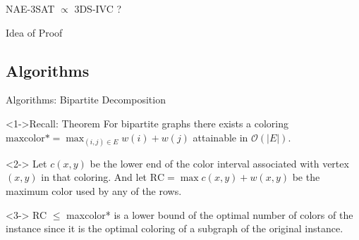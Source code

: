 \begin{frame}{NAE-3SAT $\propto$ 3DS-IVC ?}
  \begin{block}{Idea of Proof}
    \begin{itemize}
    \end{itemize}
  \end{block}
  
\end{frame}

\subsection{Algorithms}
\begin{frame}{Algorithms: Bipartite Decomposition}
  \begin{block}<1->{Recall: Theorem}
    For bipartite graphs there exists a coloring \\ 
  $\text{maxcolor*} = \max_{(i,j) \in E} w(i) + w(j)$ attainable in $\mathcal{O}(|E|)$.
  \end{block}

  \begin{definition}<2->
    Let $c(x, y)$ be the lower end of the
    color interval associated with vertex $(x, y)$ in that coloring.
    And let $\text{RC} = \max c(x, y) + w(x, y)$ be the maximum color used by any of the rows.
  \end{definition}

  \begin{corollary}<3->
    RC $\leq$ maxcolor* is a lower bound of the optimal number of colors of the instance since it is the
    optimal coloring of a subgraph of the original instance.
  \end{corollary}

\end{frame}

